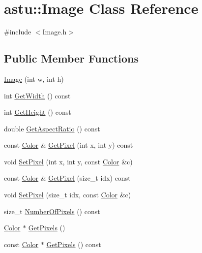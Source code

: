 \hypertarget{classastu_1_1Image}{}\section{astu\+:\+:Image Class Reference}
\label{classastu_1_1Image}


{\ttfamily \#include $<$Image.\+h$>$}

\subsection*{Public Member Functions}
\begin{DoxyCompactItemize}
\item 
\hyperlink{classastu_1_1Image_a930c3dfe86d60d209199cf27d2102446}{Image} (int w, int h)
\item 
int \hyperlink{classastu_1_1Image_a654888b88e109da1099ade3ec54f0520}{Get\+Width} () const
\item 
int \hyperlink{classastu_1_1Image_ad64d3b2abc18e54ba8beb4e212a75a10}{Get\+Height} () const
\item 
double \hyperlink{classastu_1_1Image_a06bdd931e5090f1eca62bd305b83cfd5}{Get\+Aspect\+Ratio} () const
\item 
const \hyperlink{classastu_1_1Color}{Color} \& \hyperlink{classastu_1_1Image_a8a31850315f2c74bc90627f4a292a10d}{Get\+Pixel} (int x, int y) const
\item 
void \hyperlink{classastu_1_1Image_a3c4770367d30abf8cefaa5cf777501a4}{Set\+Pixel} (int x, int y, const \hyperlink{classastu_1_1Color}{Color} \&c)
\item 
const \hyperlink{classastu_1_1Color}{Color} \& \hyperlink{classastu_1_1Image_a0ff83b1620356fdbe3ee3771d8a3ddb2}{Get\+Pixel} (size\+\_\+t idx) const
\item 
void \hyperlink{classastu_1_1Image_a1c2f1673fbba03abc50101c2d75ef12e}{Set\+Pixel} (size\+\_\+t idx, const \hyperlink{classastu_1_1Color}{Color} \&c)
\item 
size\+\_\+t \hyperlink{classastu_1_1Image_a53c53ecc0210786efa7f514966ad406b}{Number\+Of\+Pixels} () const
\item 
\hyperlink{classastu_1_1Color}{Color} $\ast$ \hyperlink{classastu_1_1Image_a3ce797d40010a7536662562c5f2e52da}{Get\+Pixels} ()
\item 
const \hyperlink{classastu_1_1Color}{Color} $\ast$ \hyperlink{classastu_1_1Image_ad2f3de6cc397bbc924c3718e54b1182f}{Get\+Pixels} () const
\end{DoxyCompactItemize}


